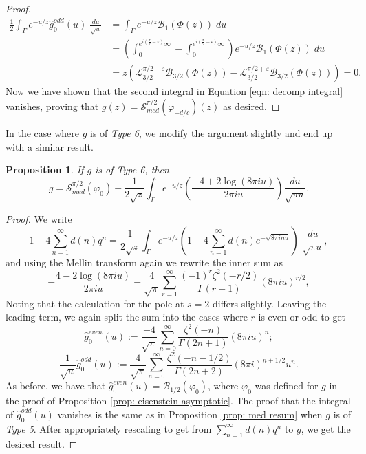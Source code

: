 \documentclass[12pt]{amsart}
\theoremstyle{definition}
\theoremstyle{plain}
\newtheorem{prop}[theorem]{Proposition}
\numberwithin{equation}{section}
\begin{document}
\begin{proof}
\begin{align*}\frac{1}{2}\int_\Gamma e^{-u/z} \widehat{g}_{0}^{odd}(u) \;\frac{du}{\sqrt{u}} &= \int_\Gamma e^{-u/z} \mathcal{B}_1(\Phi(z))\;du
\\
&= \left(\int_0^{e^{i(\frac{\pi}{2}-\varepsilon)}\infty}- \int_0^{e^{i(\frac{\pi}{2}+\varepsilon)}\infty}\right) e^{-u/z} \mathcal{B}_1(\Phi(z)) \;du \\
&=  z\left(\mathcal{L}_{3/2}^{\pi/2-\varepsilon}\mathcal{B}_{3/2}(\Phi(z)) - \mathcal{L}_{3/2}^{\pi/2+\varepsilon}\mathcal{B}_{3/2}(\Phi(z))\right) = 0. 
\end{align*}
Now we have shown that the second integral in Equation \ref{eqn: decomp integral} vanishes, proving that $g(z)
=  \mathcal{S}^{\pi/2}_{med}(\varphi_{-d/c})(z)$ as desired.
\qedhere

\end{proof}

In the case where $g$ is of \emph{Type 6}, we modify the argument slightly and end up with a similar result. 
\begin{prop} \label{prop: eisenstein med}
If $g$ is of Type 6, then \[g= \mathcal{S}_{med}^{\pi/2}(\varphi_{0}) +\frac{1}{2\sqrt{z}}\int_\Gamma e^{-u/z} \left( \frac{-4+2\log(8\pi i u)}{2\pi i u} \right)\frac{du}{\sqrt{\pi u}}.\]	
\end{prop}
\begin{proof}
We write 
\[1-4\sum_{n = 1}^\infty d(n) q^n =  \frac{1}{2\sqrt{z}}\int_{\Gamma}e^{-u/z} \left( 1-4\sum_{n = 1}^\infty d(n) e^{-\sqrt{8\pi i nu}}\right) \;\frac{du}{\sqrt{\pi u}},
\]
and using the Mellin transform again we rewrite the inner sum as  
\begin{equation*}  - \frac{4-2\log(8\pi i u)}{2\pi i u} - \frac{4}{\sqrt{\pi }} \sum_{r=1}^\infty \frac{(-1)^r \zeta^2(-r/2)}{\Gamma(r+1)}(8\pi iu)^{r/2},
\end{equation*}
Noting that the calculation for the pole at $s=2$ differs slightly.
Leaving the leading term, we again split the sum into the cases where $r$ is even or odd to get 
\[\widehat{g}_{0}^{even}(u) := \frac{-4}{\sqrt{\pi }} \sum_{n=0}^\infty \frac{ \zeta^2(-n)}{\Gamma(2n+1)}(8\pi iu)^{n};
\]
\[\frac{1}{\sqrt{u}}\widehat{g}_{0}^{odd}(u) := \frac{4}{\sqrt{\pi }} \sum_{n=0}^\infty \frac{ \zeta^2(-n-1/2)}{\Gamma(2n+2)}(8\pi i)^{n+1/2}u^{n}.
\]
As before, we have that $\widehat{g}_{0}^{even}(u) = \mathcal{B}_{1/2}(\varphi_0)$, where $\varphi_0$ was defined for $g$ in the proof of Proposition \ref{prop: eisenstein asymptotic}. The proof that the integral of $\widehat{g}_{0}^{odd}(u)$ vanishes is the same as in Proposition \ref{prop: med resum} when $g$ is of \emph{Type 5}. 
After appropriately rescaling to get from $\sum_{n=1}^\infty d(n)q^n$ to $g$, we get the desired result. 
\end{proof}
\end{document}
